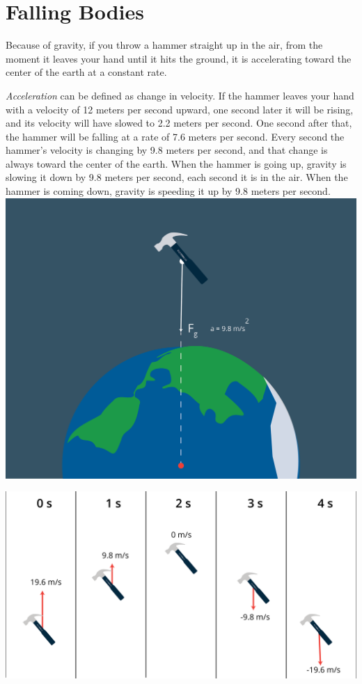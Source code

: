 \chapter{Falling Bodies}

Because of gravity, if you throw a hammer straight up in the air, from
the moment it leaves your hand until it hits the ground, it is
accelerating toward the center of the earth at a constant rate.

\emph{Acceleration} can be defined as change in velocity. If the hammer leaves your
hand with a velocity of 12 meters per second upward, one second later
it will be rising, and its velocity will have slowed to 2.2 meters per
second. One second after that, the hammer will be falling at a rate of
7.6 meters per second. Every second the hammer's velocity is changing by
9.8 meters per second, and that change is always toward the center of
the earth. When the hammer is going up, gravity is slowing it down by
9.8 meters per second, each second it is in the air.  When the hammer is coming down,
gravity is speeding it up by 9.8 meters per second.
\includegraphics[width=1\textwidth]{hammerFall.png}


\includegraphics[width=1\textwidth]{hammerTime.png}

